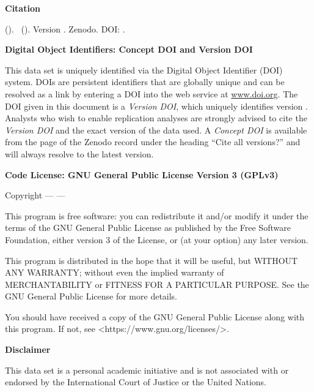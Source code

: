 \textbf{Citation}

\emph{\dataauthor} (\the\year ). \softwaretitle\ (\softwareshort ). Version \version . Zenodo. DOI: \softwareversiondoi .

\vspace{0.5cm}

\textbf{Digital Object Identifiers: Concept DOI and Version DOI}

This data set is uniquely identified via the Digital Object Identifier (DOI) system. DOIs are persistent identifiers that are globally unique and can be resolved as a link by entering a DOI into the web service at \url{www.doi.org}. The DOI given in this document is a \emph{Version DOI}, which uniquely identifies version \version. Analysts who wish to enable replication analyses are strongly advised to cite the \emph{Version DOI} and the exact version of the data used. A \emph{Concept DOI} is available from the page of the Zenodo record under the heading \enquote{Cite all versions?} and will always resolve to the latest version.

\vspace{0.5cm}



\textbf{Code License: GNU General Public License Version 3 (GPLv3)}

Copyright --- \the\year --- \dataauthor

This program is free software: you can redistribute it and/or modify it under the terms of the GNU General Public License as published by the Free Software Foundation, either version 3 of the License, or (at your option) any later version.

This program is distributed in the hope that it will be useful, but WITHOUT ANY WARRANTY; without even the implied warranty of MERCHANTABILITY or FITNESS FOR A PARTICULAR PURPOSE.  See the GNU General Public License for more details.

You should have received a copy of the GNU General Public License along with this program.  If not, see <https://www.gnu.org/licenses/>.

\vspace{0.5cm}

\textbf{Disclaimer} 

This data set is a personal academic initiative and is not associated with or endorsed by the International Court of Justice or the United Nations.


\newpage